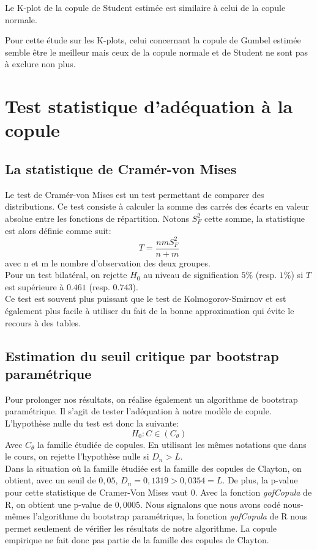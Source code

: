 Le K-plot de la copule de Student estimée est similaire à celui de la copule normale.

Pour cette étude sur les K-plots, celui concernant la copule de Gumbel estimée semble être le meilleur mais ceux de la copule normale et de Student ne sont pas à exclure non plus.

\section{Test statistique d'adéquation à la copule}

\subsection{La statistique de Cramér-von Mises}

Le test de Cramér-von Mises est un test permettant de comparer des distributions. Ce test consiste à calculer la somme des carrés des écarts en valeur absolue entre les fonctions de répartition. Notons $S_F^2$ cette somme, la statistique est alors définie comme suit:
$$T = \frac{nmS_F^2}{n + m} $$
avec n et m le nombre d'observation des deux groupes. \\
Pour un test bilatéral, on rejette $H_0$ au niveau de signification $5\%$ (resp. $1\%$) si $T$ est supérieure à $0.461$ (resp. $0.743$).\\
Ce test est souvent plus puissant que le test de Kolmogorov-Smirnov et est également plus facile à utiliser du fait de la bonne approximation qui évite le recours à des tables.

\subsection{Estimation du seuil critique par bootstrap paramétrique}

Pour prolonger nos résultats, on réalise également un algorithme de bootstrap paramétrique. Il s'agit de tester l'adéquation à notre modèle de copule. L'hypothèse nulle du test est donc la suivante:
$$
H_0 : C \in (C_{\theta})
$$
Avec $C_{\theta}$ la famille étudiée de copules.
En utilisant les mêmes notations que dans le cours, on rejette l'hypothèse nulle si $D_n > L$. \\

Dans la situation où la famille étudiée est la famille des copules de Clayton, on obtient, avec un seuil de $0,05$, $D_n = 0,1319 > 0,0354 = L$. De plus, la p-value pour cette statistique de Cramer-Von Mises vaut $0$. Avec la fonction \textit{gofCopula} de R, on obtient une p-value de $0,0005$. 
Nous signalons que nous avons codé nous-mêmes l'algorithme du bootstrap paramétrique, la fonction \textit{gofCopula} de R nous permet seulement de vérifier les résultats de notre algorithme.
La copule empirique ne fait donc pas partie de la famille des copules de Clayton.

